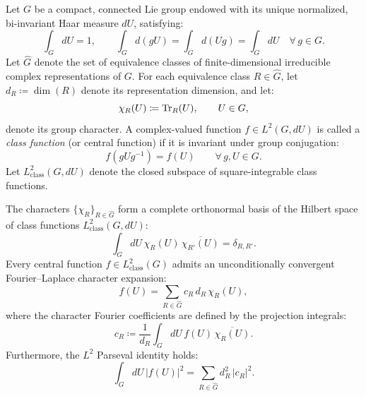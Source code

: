 Let $G$ be a compact, connected Lie group endowed with its unique normalized, bi-invariant Haar measure $dU$, satisfying:
\begin{equation}
\int_G dU = 1, \qquad \int_G d(g U) = \int_G d(U g) = \int_G dU \quad \forall \, g \in G.
\end{equation}
Let $\widehat{G}$ denote the set of equivalence classes of finite-dimensional irreducible complex representations of $G$. For each equivalence class $R \in \widehat{G}$, let $d_R \coloneqq \dim(R)$ denote its representation dimension, and let:
\begin{equation}
\chi_R(U) \coloneqq \mathrm{Tr}_R(U), \qquad U \in G,
\end{equation}
denote its group character. A complex-valued function $f \in L^2(G, dU)$ is called a \emph{class function} (or central function) if it is invariant under group conjugation:
\begin{equation}
f(g U g^{-1}) = f(U) \qquad \forall \, g, U \in G.
\end{equation}
Let $L^2_{\mathrm{class}}(G, dU)$ denote the closed subspace of square-integrable class functions.

\begin{theorem}
\label{thm:peter_weyl}
The characters $\{\chi_R\}_{R \in \widehat{G}}$ form a complete orthonormal basis of the Hilbert space of class functions $L^2_{\mathrm{class}}(G, dU)$:
\begin{equation}
\label{eq:peter_weyl_ortho}
\int_G dU \, \chi_R(U) \, \overline{\chi_{R'}(U)} = \delta_{R, R'}.
\end{equation}
Every central function $f \in L^2_{\mathrm{class}}(G)$ admits an unconditionally convergent Fourier--Laplace character expansion:
\begin{equation}
\label{eq:character_expansion_general_app}
f(U) = \sum_{R \in \widehat{G}} c_R \, d_R \, \chi_R(U),
\end{equation}
where the character Fourier coefficients are defined by the projection integrals:
\begin{equation}
\label{eq:cr_coefficient_def}
c_R \coloneqq \frac{1}{d_R} \int_G dU \, f(U) \, \overline{\chi_R(U)}.
\end{equation}
Furthermore, the $L^2$ Parseval identity holds:
\begin{equation}
\label{eq:parseval_characters}
\int_G dU \, |f(U)|^2 = \sum_{R \in \widehat{G}} d_R^2 \, |c_R|^2.
\end{equation}
\end{theorem}

